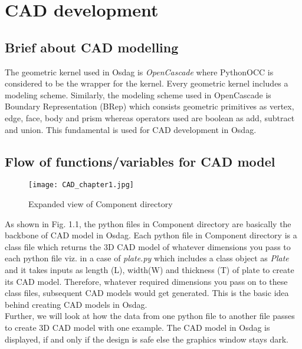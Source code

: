 \chapter{CAD development}
\section{Brief about CAD modelling}
The geometric kernel used in Osdag is \textit{OpenCascade} where PythonOCC is considered to be the wrapper for the kernel. Every geometric kernel includes a modeling scheme. Similarly, the modeling scheme used in OpenCascade is Boundary Representation (BRep) which consists geometric primitives as vertex, edge, face, body and prism whereas operators used are boolean as add, subtract and union. This fundamental is used for CAD development in Osdag.

\section{Flow of functions/variables for CAD model}
\begin{figure}[h]
	\texttt{[image: CAD\_chapter1.jpg]}
	\caption{Expanded view of Component directory}
\end{figure}
As shown in Fig. 1.1, the python files in Component directory are basically the backbone of CAD model in Osdag. Each python file in Component directory is a class file which returns the 3D CAD model of whatever dimensions you pass to each python file
viz. in a case of \textit{plate.py} which includes a class object as \textit{Plate} and it takes inputs as length (L), width(W) and thickness (T) of plate to create its CAD model. Therefore, whatever required dimensions you pass on to these class files, subsequent CAD models would get generated. This is the basic idea behind creating CAD models in Osdag.\\
Further, we will look at how the data from one python file to another file passes to create 3D CAD model with one example.
The CAD model in Osdag is displayed, if and only if the design is safe else the graphics window stays dark.

